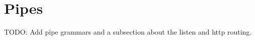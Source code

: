 \documentclass[./Report_main.tex]{subfiles}
\begin{document}
\section{Pipes}
TODO: Add pipe grammars and a subsection about the listen and http routing.
\begin{comment}
Async control flow is incredibly useful when dealing with I/O operations, which are the foundation of web-based programming. When restricted to a single-threaded and single-process model, I/O operations in a programming language are blocking forcing the program to wait for a potentially unbounded time. Introduce multi-threading or multi-process models, and a programming language becomes much more complex. The single-threaded asynchronous control flow model simplifies dealing with I/O operations such that the program does not.


\subsection{My First Pipeline}
Consider the following example pipeline:


\end{comment}
\end{document}
